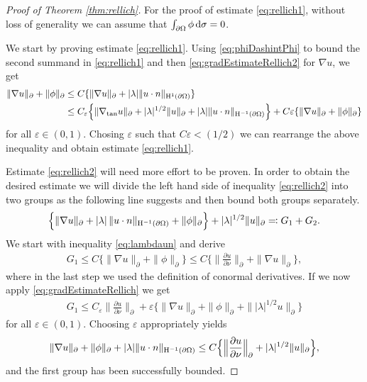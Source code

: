 \begin{proof}[Proof of Theorem \ref{thm:rellich}]
  For the proof of estimate \eqref{eq:rellich1}, without loss of generality we can assume that $\int_{\partial\Omega} \phi \, {\operatorname{d}\!{\sigma}} = 0$.

  We start by proving estimate \eqref{eq:rellich1}. 
  Using \eqref{eq:phiDashintPhi} to bound the second summand in \eqref{eq:rellich1} and then \eqref{eq:gradEstimateRellich2} for $\nabla u$, we get
  \begin{align*}
    \|\nabla u\|_\partial + \|\phi\|_\partial
    &\leq C \{ \|\nabla u\|_\partial + |\lambda| \|u \cdot n \|_{\mathrm{H}^1(\partial\Omega)} \} \\
    &\leq C_\varepsilon \Big\{ \|\nabla_{\mathrm{tan}} u \|_\partial + |\lambda|^{1/2} \|u\|_\partial + |\lambda| \| u\cdot n\|_{\mathrm{H}^{-1}(\partial\Omega)} \Big\} 
     + C \varepsilon \{ \|\nabla u\|_\partial + \|\phi\|_\partial \}
  \end{align*}
  for all $\varepsilon \in (0,1)$.
  Chosing $\varepsilon$ such that $C \varepsilon < (1/2)$ we can rearrange the above inequality and obtain estimate \eqref{eq:rellich1}.

  Estimate \eqref{eq:rellich2} will need more effort to be proven.
  In order to obtain the desired estimate we will divide the left hand side of inequality \eqref{eq:rellich2} into two groups as the following line suggests and then bound both groups separately.
  \begin{align*}
    \Big\{ \|\nabla u\|_\partial + |\lambda|\, \|u \cdot n\|_{\mathrm{H}^{-1}(\partial\Omega)} + \|\phi\|_\partial \Big\} + |\lambda|^{1/2} \|u\|_\partial \eqqcolon G_1 + G_2.
  \end{align*}
  We start with inequality \eqref{eq:lambdaun} and derive
  \begin{align*}
    G_1
    \leq C \big\{ \|\nabla u\|_\partial + \| \phi\|_\partial \big\}
    \leq C \Big\{ \Big\|\frac{\partial u}{\partial \nu} \Big\|_\partial + \|\nabla u\|_\partial \Big\},
  \end{align*}
  where in the last step we used the definition of conormal derivatives.
  If we now apply \eqref{eq:gradEstimateRellich} we get
  \begin{align*}
    G_1
    \leq C_\varepsilon \| \frac{\partial u}{\partial \nu} \|_\partial + \varepsilon \big\{ \|\nabla u\|_\partial + \|\phi\|_\partial + \| |\lambda|^{1/2} u \|_\partial \big\}
  \end{align*}
  for all $\varepsilon \in (0,1)$.
  Choosing $\varepsilon$ appropriately yields
  \begin{align}
    \label{eq:partOfRellich2}
    \|\nabla u\|_\partial + \|\phi\|_\partial + |\lambda| \|u \cdot n\|_{\mathrm{H}^{-1}(\partial\Omega)}
    \leq C \Big\{ \Big\|\frac{\partial u}{\partial \nu} \Big\|_\partial + |\lambda|^{1/2} \| u\|_\partial \Big\},
  \end{align}
  and the first group has been successfully bounded.


\end{proof}
